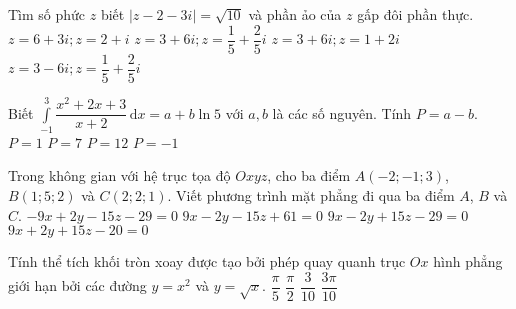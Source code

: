	\begin{ex}%
		Tìm số phức $z$ biết $|z-2-3i|=\sqrt{10}$ và phần ảo của $z$ gấp đôi phần thực.
		\choice
		{$z=6+3i; z=2+i$}
		{\True $z=3+6i; z=\dfrac{1}{5}+\dfrac{2}{5}i$}
		{$z=3+6i; z=1+2i$}
		{$z=3-6i; z=\dfrac{1}{5}+\dfrac{2}{5}i$}
	\end{ex}
	\begin{ex}%
		Biết $\displaystyle\int\limits_{-1}^{3}\dfrac{x^2+2x+3}{x+2}\mathrm{\,d}x=a+b\ln 5$ với $a,b$ là các số nguyên. Tính $P=a-b$.
		\choice
		{\True $P=1$}
		{$P=7$}
		{$P=12$}
		{$P=-1$}
	\end{ex}
	\begin{ex}%
		Trong không gian với hệ trục tọa độ $Oxyz$, cho ba điểm $A(-2;-1;3)$, $B(1;5;2)$ và $C(2;2;1)$. Viết phương trình mặt phẳng đi qua ba điểm $A$, $B$ và $C$.
		\choice
		{$-9x+2y-15z-29=0$}
		{$9x-2y-15z+61=0$}
		{\True $9x-2y+15z-29=0$}
		{$9x+2y+15z-20=0$}
	\end{ex}
	\begin{ex}%
		Tính thể tích khối tròn xoay được tạo bởi phép quay quanh trục $Ox$ hình phẳng giới hạn bởi các đường $y=x^2$ và $y=\sqrt{x}$.
		\choice
		{$\dfrac{\pi}{5}$}
		{$\dfrac{\pi}{2}$}
		{$\dfrac{3}{10}$}
		{\True $\dfrac{3\pi}{10}$}
	\end{ex}
